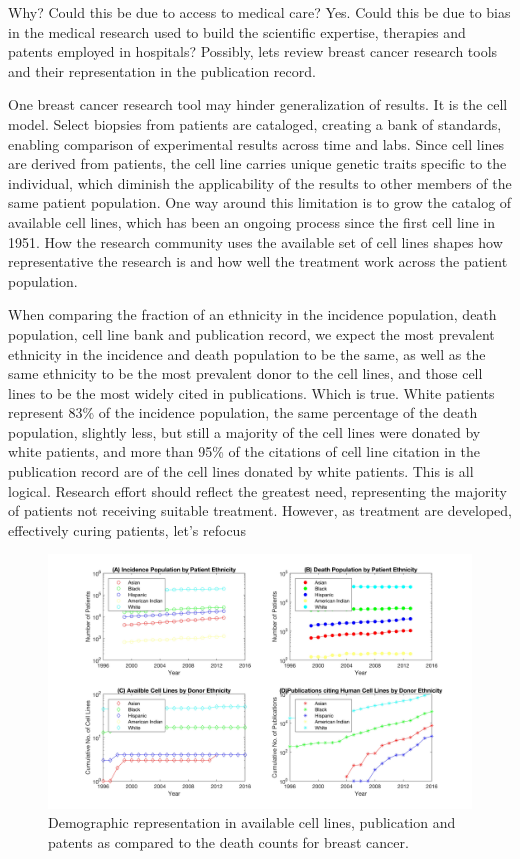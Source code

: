 \documentclass[11pt]{article}
\begin{document}
Why? Could this be due to access to medical care? Yes. Could this be due to bias in the medical research used to build the scientific expertise, therapies and patents employed in hospitals? Possibly, lets review breast cancer research tools and their representation in the publication record. 

One breast cancer research tool may hinder generalization of results. It is the cell model. Select biopsies from patients are cataloged, creating a bank of standards, enabling comparison of experimental results across time and labs. Since cell lines are derived from patients, the cell line carries unique genetic traits specific to the individual, which diminish the applicability of the results to other members of the same patient population. One way around this limitation is to grow the catalog of available cell lines, which has been an ongoing process since the first cell line in 1951. How the research community uses the available set of cell lines shapes how representative the research is and how well the treatment work across the patient population.  

When comparing the fraction of an ethnicity in the incidence population, death population, cell line bank and publication record, we expect the most prevalent ethnicity in the incidence and death population to be the same, as well as the same ethnicity to be the most prevalent donor to the cell lines, and those cell lines to be the most widely cited in publications. Which is true.  White patients represent 83\% of the incidence population, the same percentage of the death population, slightly less, but still a majority of the cell lines were donated by white patients, and more than 95\% of the citations of cell line citation in the publication record are of the cell lines donated by white patients. This is all logical. Research effort should reflect the greatest need, representing the majority of patients not receiving suitable treatment. However, as treatment are developed, effectively curing patients, let's refocus 

\begin{figure}[h!]
\centering
\includegraphics[width=1\columnwidth, trim = {10cm 0cm 10cm 0cm}, clip]{Figures/Timeline2x2.jpg}
\caption{\label{PS} Demographic representation in available cell lines, publication and patents as compared to the death counts for breast cancer.}
\end{figure}
\end{document}
